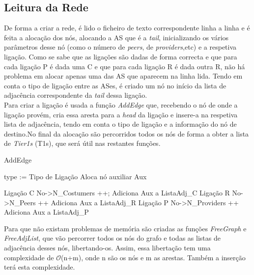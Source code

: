 \documentclass[twocolumn]{article} %
\begin{document}
		\subsection{Leitura da Rede}

			De forma a criar a rede, é lido o ficheiro de texto correspondente linha a linha e é feita a alocação dos nós, alocando a AS que é a \emph{tail}, inicializando os vários parâmetros desse nó (como o número de \emph{peers}, de \emph{providers},etc) e a respetiva ligação. Como se sabe que as ligações são dadas de forma correcta e que para cada ligação P é dada uma C e que para cada ligação R é dada outra R, não há problema em alocar apenas uma das AS que aparecem na linha lida. Tendo em conta o tipo de ligação entre as ASes, é criado um nó no início da lista de adjacência correspondente da \emph{tail} dessa ligação.\\

			\noindent Para criar a ligação é usada a função \emph{AddEdge} que, recebendo o nó de onde a ligação provém, cria essa aresta para a \emph{head} da ligação e insere-a na respetiva lista de adjacência, tendo em conta o tipo de ligação e a informação do nó de destino.No final da alocação são percorridos todos os nós de forma a obter a lista de \emph{Tier1s} (T1s), que será útil nas restantes funções.

			\begin{algorithm}[htbp]
			\caption{AddEdge}
			\begin{algorithmic}[1]
				
				\State type := Tipo de Ligação
				\State Aloca nó auxiliar Aux

					\State Ligação C
					\State No->N\_Costumers ++;
					\State Adiciona Aux a ListaAdj\_C
				\Else
						\State Ligação R
						\State No->N\_Peers ++
						\State Adiciona Aux a ListaAdj\_R
					\Else
						\State Ligação P
						\State No->N\_Providers ++
						\State Adiciona Aux a ListaAdj\_P
					\EndIf
				\EndIf

			\end{algorithmic}
			\end{algorithm}

			\noindent Para que não existam problemas de memória são criadas as funções \emph{FreeGraph} e \emph{FreeAdjList}, que vão percorrer todos os nós do grafo e todas as listas de adjacência desses nós, libertando-os. Assim, essa libertação tem uma complexidade de $\mathcal{O}$(n+m), onde n são os nós e m as arestas. Também a inserção terá esta complexidade.
\end{document}
